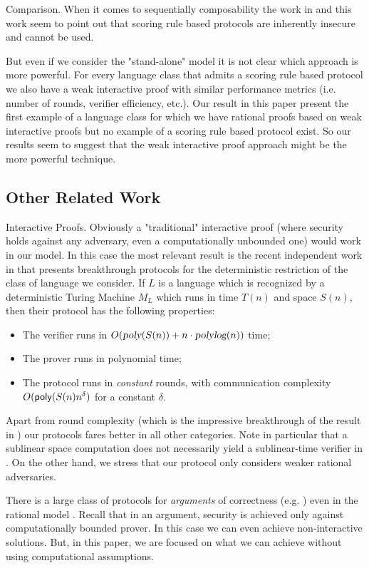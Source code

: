 \medskip
\noindent
{\sc Comparison.}
When it comes to sequentially composability the work in \cite{cg15} and this work seem to point out that scoring rule based protocols are inherently insecure and cannot be used. 

But even if we consider the "stand-alone" model it is not clear which approach is more powerful. For every language class that admits a scoring rule based protocol we also have a weak interactive proof with similar performance metrics (i.e. number of rounds, verifier efficiency, etc.). Our result in this paper present the first example of a language class for which we have rational proofs based on weak interactive proofs but no example of a scoring rule based protocol exist. So our results seem to suggest that the weak interactive proof approach might be the more powerful technique. 

\subsection{Other Related  Work}
\label{sec:prior}

{\sc Interactive Proofs.}
Obviously a "traditional" interactive proof (where security holds against any adversary, even a computationally unbounded one) would work in our model. In this case the most relevant result is 
the recent independent work in \cite{rrr16} that presents breakthrough protocols for the deterministic restriction of the class of language we consider. If $L$ is a language which is recognized by a deterministic Turing Machine $M_L$ which runs in time $T(n)$ and space $S(n)$, then their protocol has the following properties: 
\begin{itemize}
\item The verifier runs in 
$O({\textsl{poly}}(S(n)) + n \cdot{\ensuremath{\textsl{polylog}}}(n))$ time;
\item The prover runs in polynomial time;
\item The protocol runs in {\em constant} rounds, with communication complexity $O({\sf poly}(S(n)n^{\delta})$ for a constant $\delta$.
\end{itemize}
Apart from round complexity (which is the impressive breakthrough of the result in \cite{rrr16}) our protocols fares better in all other categories. Note in particular that a sublinear space computation does not necessarily yield a sublinear-time verifier in 
\cite{rrr16}. On the other hand, we stress that our protocol only considers weaker rational adversaries. 

\medskip
{}
There is a large class of protocols for {\em arguments} of correctness (e.g. \cite{ggp10,ggpr13,krr14}) even in the rational model \cite{ratargs,ratsumchecks}. Recall that in an argument, security is achieved only against computationally bounded prover. In this case we can even achieve non-interactive solutions. But, in this paper, we are focused on what we can achieve without using computational assumptions.

